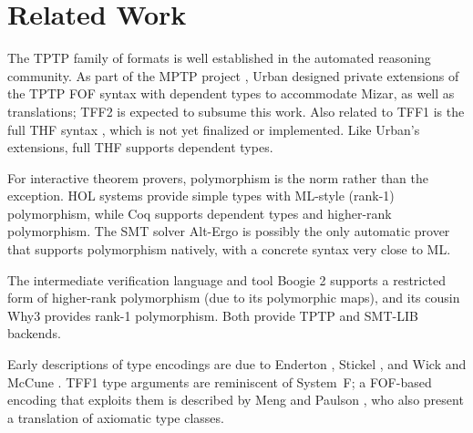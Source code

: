 \section{Related Work}
\label{sec_related}

The TPTP family of formats is well established in the automated reasoning
community. As part of the MPTP project \cite{urban-2006}, Urban designed private
extensions of the TPTP FOF syntax with dependent types to
accommodate Mizar, as well as translations; TFF2 is expected to subsume this work. Also
related to TFF1 is the full THF syntax \cite{sutcliffe-benzmueller-2010}, which
is not yet finalized or implemented. Like Urban's extensions, full THF supports
dependent types.


For interactive theorem provers, polymorphism is the norm rather
than the exception. HOL systems
\cite{gordon-melham-1993,harrison-1996,nipkow-et-al-2002} provide simple types
with %
ML-style (rank-1) polymorphism, while Coq
\cite{bertot-casteran-2004} supports dependent types and higher-rank
polymorphism.
The SMT solver Alt-Ergo \cite{bobot-et-al-2008} is possibly the only automatic
prover that supports polymorphism natively, with a concrete syntax very close to
ML.

The intermediate verification language and tool Boogie 2 \cite{leino-ruemmer-2010}
supports a restricted form of higher-rank polymorphism (due to its polymorphic maps),
and its cousin Why3 \cite{bobot-et-al-2011}
provides rank-1 polymorphism. Both provide TPTP and SMT-LIB backends.

Early descriptions of type encodings are due to Enderton
\cite[\S4.3]{enderton-1972}, Stickel \cite[p.~99]{stickel-1986}, and Wick and
McCune \cite[\S4]{wick-mccune-1989}. TFF1 type arguments are reminiscent of
System~F; a FOF-based encoding that exploits them is described by Meng and
Paulson \cite{meng-paulson-2008-trans}, who also present a translation of
axiomatic type classes.

